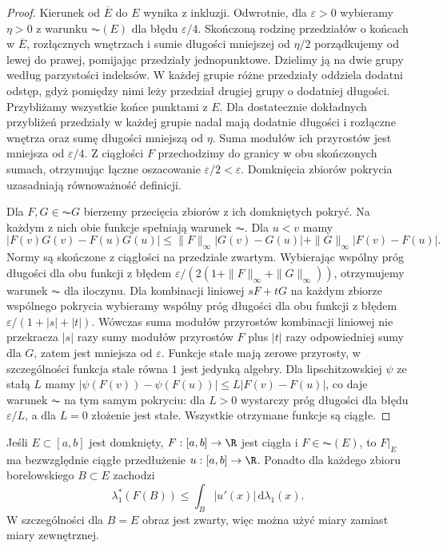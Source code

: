 \begin{proof}
Kierunek od $\overline E$ do $E$ wynika z inkluzji.
Odwrotnie, dla $\varepsilon>0$ wybieramy $\eta>0$ z warunku
$\AC(E)$ dla błędu $\varepsilon/4$. Skończoną rodzinę
przedziałów o końcach w $\overline E$, rozłącznych wnętrzach
i sumie długości mniejszej od $\eta/2$ porządkujemy od lewej
do prawej, pomijając przedziały jednopunktowe.
Dzielimy ją na dwie grupy według parzystości indeksów.
W każdej grupie różne przedziały oddziela dodatni odstęp,
gdyż pomiędzy nimi leży przedział drugiej grupy o dodatniej
długości. Przybliżamy wszystkie końce punktami z $E$.
Dla dostatecznie dokładnych przybliżeń przedziały w każdej
grupie nadal mają dodatnie długości i rozłączne wnętrza oraz sumę długości
mniejszą od $\eta$. Suma modułów ich przyrostów jest
mniejsza od $\varepsilon/4$. Z ciągłości $F$ przechodzimy
do granicy w obu skończonych sumach, otrzymując łączne
oszacowanie $\varepsilon/2<\varepsilon$. Domknięcia zbiorów
pokrycia uzasadniają równoważność definicji.

Dla $F,G\in\AC G$ bierzemy przecięcia zbiorów z ich
domkniętych pokryć. Na każdym z nich obie funkcje spełniają
warunek $\AC$. Dla $u<v$ mamy
\[
 |F(v)G(v)-F(u)G(u)|
 \le \|F\|_\infty|G(v)-G(u)|+
 \|G\|_\infty|F(v)-F(u)|.
\]
Normy są skończone z ciągłości na przedziale zwartym.
Wybierając wspólny próg długości dla obu funkcji z błędem
$\varepsilon/(2(1+\|F\|_\infty+\|G\|_\infty))$,
otrzymujemy warunek $\AC$ dla iloczynu.
Dla kombinacji liniowej $sF+tG$ na każdym
zbiorze wspólnego pokrycia wybieramy wspólny próg
długości dla obu funkcji z błędem
$\varepsilon/(1+|s|+|t|)$.
Wówczas suma modułów przyrostów kombinacji liniowej
nie przekracza $|s|$ razy sumy modułów przyrostów $F$
plus $|t|$ razy odpowiedniej sumy dla $G$, zatem jest
mniejsza od $\varepsilon$.
Funkcje stałe mają zerowe przyrosty, w szczególności
funkcja stale równa $1$ jest jedynką algebry. Dla lipschitzowskiej $\psi$ ze stałą $L$ mamy
$|\psi(F(v))-\psi(F(u))|\le L|F(v)-F(u)|$,
co daje warunek $\AC$ na tym samym pokryciu: dla $L>0$
wystarczy próg długości dla błędu $\varepsilon/L$, a dla $L=0$
złożenie jest stałe.
Wszystkie otrzymane funkcje są ciągłe.
\end{proof}
\begin{lemat}\label{it:lem:ac-affine-extension}
Jeśli $E\subset[a,b]$ jest domknięty, $F:[a,b]\to\R$ jest ciągła i $F\in\AC(E)$, to $F|_E$ ma bezwzględnie ciągłe przedłużenie $u:[a,b]\to\R$. Ponadto dla każdego zbioru borelowskiego $B\subset E$ zachodzi
\[
 \lambda_1^*(F(B))\le\int_B|u'(x)|\,\mathrm d\lambda_1(x).
\]
W szczególności dla $B=E$ obraz jest zwarty, więc można użyć miary zamiast miary zewnętrznej.
\end{lemat}

